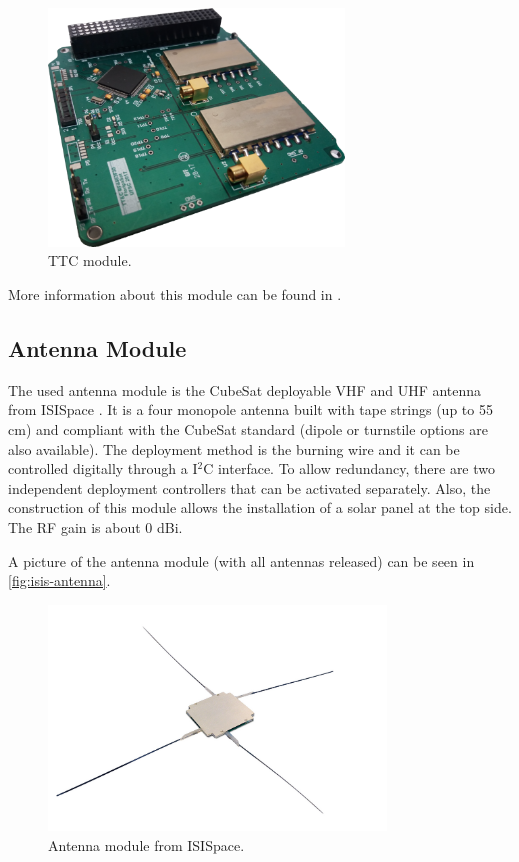 \begin{figure}[!ht]
    \begin{center}
        \includegraphics[width=0.7\textwidth]{figures/ttc_board}
        \caption{TTC module.}
        \label{fig:ttc}
    \end{center}
\end{figure}

More information about this module can be found in \cite{ttc}.

\subsection{Antenna Module}

The used antenna module is the CubeSat deployable VHF and UHF antenna from ISISpace \cite{isis-antenna}. It is a four monopole antenna built with tape strings (up to 55 cm) and compliant with the CubeSat standard (dipole or turnstile options are also available). The deployment method is the burning wire and it can be controlled digitally through a I$^{2}$C interface. To allow redundancy, there are two independent deployment controllers that can be activated separately. Also, the construction of this module allows the installation of a solar panel at the top side. The RF gain is about 0 dBi.

A picture of the antenna module (with all antennas released) can be seen in \autoref{fig:isis-antenna}.

\begin{figure}[!ht]
    \begin{center}
        \includegraphics[width=0.8\textwidth]{figures/isis-antenna}
        \caption{Antenna module from ISISpace.}
        \label{fig:isis-antenna}
    \end{center}
\end{figure}

